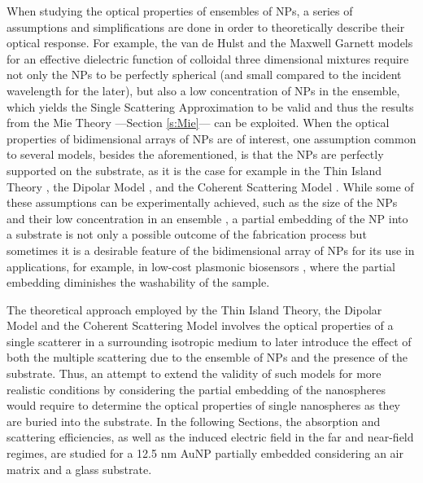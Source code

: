 
When studying the optical properties of ensembles of NPs, a series of assumptions and simplifications are done in order to theoretically describe their optical response. For example, the van de Hulst  \cite{hulst_light_1981} and the Maxwell Garnett \cite{sihvola_electromagnetic_2008} models for an effective dielectric function of colloidal three dimensional mixtures require not only the NPs to be perfectly spherical (and small compared to the incident wavelength for the later), but also a low concentration of NPs in the ensemble, which yields the Single Scattering Approximation to be valid and thus the results from the Mie Theory ---Section \ref{s:Mie}--- can be exploited. When the optical properties of bidimensional arrays of NPs are of interest, one assumption common to several models, besides the aforementioned, is that the NPs are  perfectly supported on the substrate, as it is the case for example in the Thin Island Theory \cite{bedeaux_optical_2004}, the Dipolar Model \cite{barrera1991optical}, and the Coherent Scattering Model \cite{garcia2012multiple}. While some of these assumptions can be experimentally achieved, such as the size of the NPs and their low concentration in an ensemble \cite{reyes2022enhancement}, a partial embedding of the NP into a substrate is not only a possible outcome of the fabrication process \cite{meng_anisotropic_2015} but sometimes it is a desirable feature of the bidimensional array of NPs for its use in applications, for example, in low-cost plasmonic biosensors \cite{moirangthem_enhanced_2012}, where the partial embedding diminishes the washability of the sample.

The theoretical approach employed by the Thin Island Theory, the Dipolar Model and the Coherent Scattering Model involves the optical properties of a single scatterer in a surrounding isotropic medium to later introduce the effect of both the multiple scattering due to the ensemble of NPs and the presence of the substrate. Thus, an attempt to extend the validity  of such models for more realistic conditions by considering the partial embedding of the nanospheres would require to determine the optical properties of single nanospheres as they are buried into the substrate. In the following Sections, the absorption and scattering efficiencies, as well as the induced electric field in the far and near-field regimes, are studied for a 12.5 nm AuNP partially embedded considering an air matrix and a glass substrate.
